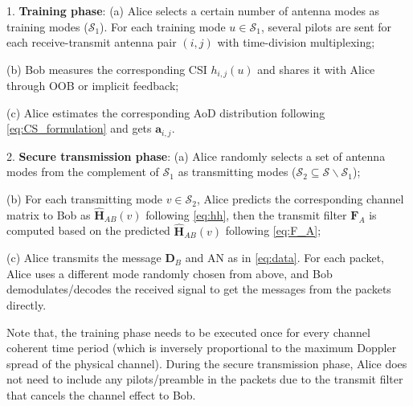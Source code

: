 1. \textbf{Training phase}: 
 (a) Alice selects a certain number of antenna modes as training modes ($\mathcal{S}_1$). For each training mode $u \in \mathcal{S}_1$, several pilots are sent for each receive-transmit antenna pair $(i,j)$ with time-division multiplexing;
 
 (b) Bob measures the corresponding CSI $h_{i,j}(u)$ and shares it with Alice through OOB or implicit feedback;
 
  (c) Alice estimates the corresponding AoD distribution following \eqref{eq:CS_formulation} and gets $\mathbf{a}_{i,j}$.

2. \textbf{Secure transmission phase}:
(a) Alice randomly selects a set of antenna modes from the complement of $\mathcal{S}_1$ as transmitting modes ($\mathcal{S}_2 \subseteq \mathcal{S} \backslash \mathcal{S}_1$);

(b)  For each transmitting mode $v \in \mathcal{S}_2$, Alice predicts the corresponding channel matrix to Bob as $\hat{\mathbf{H}}_{AB}(v)$ following \eqref{eq:hh}, then the transmit filter $\mathbf{F}_A$ is computed based on the predicted $\hat{\mathbf{H}}_{AB}(v)$ following \eqref{eq:F_A};
        
(c) Alice transmits the message $\mathbf{D}_B$ and AN as in \eqref{eq:data}. For each packet, Alice uses a different mode randomly chosen from above, and Bob demodulates/decodes the received signal to get the messages from the packets directly.

Note that, the training phase needs to be executed once for every channel coherent time period (which is inversely proportional to the maximum Doppler spread of the physical channel). During the secure transmission phase, Alice does not need to include any pilots/preamble in the packets due to the transmit filter that cancels the channel effect to Bob. 
